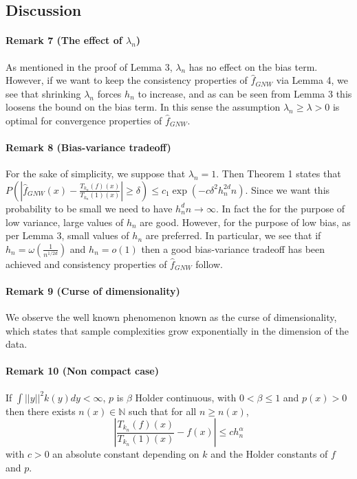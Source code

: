 \documentclass{article}
\begin{document}
\subsection{Discussion}

\paragraph{Remark 7 (The effect of $\lambda_n$)} As mentioned in the proof of Lemma 3, $\lambda_n$ has no effect on the bias term. However, if we want to keep the consistency properties of $\hat{f}_{GNW}$ via Lemma 4, we see that shrinking $\lambda_n$ forces $h_n$ to increase, and as can be seen from Lemma 3 this loosens the bound on the bias term. In this sense the assumption $\lambda_n\geq 
\lambda>0$ is optimal for convergence properties of $\hat{f}_{GNW}$.

\paragraph{Remark 8 (Bias-variance tradeoff)}
For the sake of simplicity, we suppose that $\lambda_n=1$. Then Theorem 1 states that   $P(|\hat{f}_{GNW}(x)-\frac{T_{k_n}(f)(x)}{T_{k_n}(1)(x)}|\geq \delta)
\leq c_1\exp(-c\delta^2h_n^{2d}n) $. Since we want this probability to be small we need to have $h_n^dn\rightarrow\infty$. In fact the for the purpose of low variance, large values of $h_n$ are good. However, for the purpose of low bias, as per Lemma 3, small values of $h_n$ are preferred. In particular, we see that if $h_n=\omega(\frac{1}{n^{1/2d}})$ and $h_n=o(1)$ then a good bias-variance tradeoff has been achieved and consistency properties of $\hat{f}_{GNW}$ follow.

\paragraph{Remark 9 (Curse of dimensionality)}
We observe the well known phenomenon known as the curse of dimensionality, which states that sample complexities grow exponentially in the dimension of the data.


\paragraph{Remark 10 (Non compact case)}
If $\int ||y||^2k(y)dy<\infty$,
    $p$ is $\beta$ Holder continuous, with $0<\beta\leq 1$ and $p(x)>0$ then there exists $n(x)\in \mathbb{N}$ such that for all $n\geq  n(x)$,
    \begin{equation*}
        |\frac{T_{k_n}(f)(x)}{T_{k_n}(1)(x)}-f(x)|\leq ch_n^{\alpha}
    \end{equation*}
    with $c>0$ an absolute constant depending on $k$ and the Holder constants of $f$ and $p$.
\end{document}
